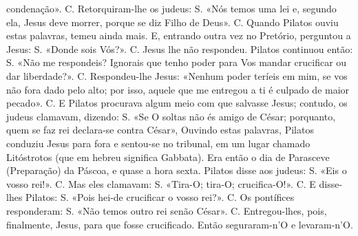\begin{paracol}{2}
{condenação». {\redx C.} Retorquiram-lhe os judeus: {\redx S.} «Nós temos uma lei e, segundo ela, Jesus deve morrer, porque se diz Filho de Deus». {\redx C.} Quando Pilatos ouviu estas palavras, temeu ainda mais. E, entrando outra vez no Pretório, perguntou a Jesus: {\redx S.} «Donde sois Vós?». {\redx C.} Jesus lhe não respondeu. Pilatos continuou então: {\redx S.} «Não me respondeis? Ignorais que tenho poder para Vos mandar crucificar ou dar liberdade?». {\redx C.} Respondeu-lhe Jesus: \cruz «Nenhum poder teríeis em mim, se vos não fora dado pelo alto; por isso, aquele que me entregou a ti é culpado de maior pecado». {\redx C.} E Pilatos procurava algum meio com que salvasse Jesus; contudo, os judeus clamavam, dizendo: {\redx S.} «Se O soltas não és amigo de César; porquanto, quem se faz rei declara-se contra César», Ouvindo estas palavras, Pilatos conduziu Jesus para fora e sentou-se no tribunal, em um lugar chamado Litóstrotos (que em hebreu significa Gabbata). Era então o dia de Parasceve (Preparação) da Páscoa, e quase a hora sexta. Pilatos disse aos judeus: {\redx S.} «Eis o vosso rei!». {\redx C.} Mas eles clamavam: {\redx S.} «Tira-O; tira-O; crucifica-O!». {\redx C.} E disse-lhes Pilatos: {\redx S.} «Pois hei-de crucificar o vosso rei?». {\redx C.} Os pontífices responderam: {\redx S.} «Não temos outro rei senão César». {\redx C.} Entregou-lhes, pois, finalmente, Jesus, para que fosse crucificado. Então seguraram-n’O e levaram-n’O.
}\switchcolumn*{}\switchcolumn\portugues{
}
\end{paracol}
